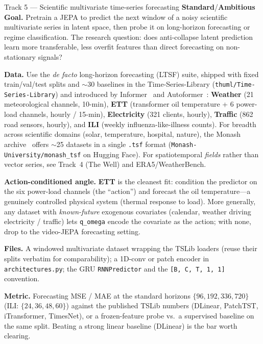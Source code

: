 \documentclass{article}
\newcommand{\code}[1]{\texttt{\small #1}}
\newcommand{\file}[1]{\texttt{\small #1}}
\newcommand{\diffmed}{\colorbox{ebamber!18}{\textcolor{ebamber}{\small\bfseries Standard}}}
\newcommand{\diffhard}{\colorbox{ebred!15}{\textcolor{ebred}{\small\bfseries Ambitious}}}
\begin{document}
\begin{trackbox}{Track 5 --- Scientific multivariate time-series forecasting \hfill \diffmed{}/\diffhard{}}
\textbf{Goal.} Pretrain a JEPA to predict the next window of a noisy scientific
multivariate series in latent space, then probe it on long-horizon forecasting or
regime classification. The research question: does anti-collapse latent prediction
learn more transferable, less overfit features than direct forecasting on
non-stationary signals?

\smallskip
\textbf{Data.} Use the \emph{de facto} long-horizon forecasting (LTSF) suite,
shipped with fixed train/val/test splits and $\sim$30 baselines in the
Time-Series-Library (\code{thuml/Time-Series-Library}) and introduced by
Informer~\citep{Informer} and Autoformer~\citep{Autoformer}: \textbf{Weather} (21
meteorological channels, 10-min), \textbf{ETT} (transformer oil temperature + 6
power-load channels, hourly / 15-min), \textbf{Electricity} (321 clients, hourly),
\textbf{Traffic} (862 road sensors, hourly), and \textbf{ILI} (weekly
influenza-like-illness counts). For breadth across scientific domains (solar,
temperature, hospital, nature), the Monash archive~\citep{MonashTSF} offers
$\sim$25 datasets in a single \code{.tsf} format (\code{Monash-University/monash\_tsf}
on Hugging Face). For spatiotemporal \emph{fields} rather than vector series, see
Track~4 (The Well) and ERA5/WeatherBench.

\smallskip
\textbf{Action-conditioned angle.} \textbf{ETT} is the cleanest fit: condition the
predictor on the six power-load channels (the ``action'') and forecast the oil
temperature---a genuinely controlled physical system (thermal response to load).
More generally, any dataset with \emph{known-future} exogenous covariates
(calendar, weather driving electricity / traffic) lets \code{q\_omega} encode the
covariate as the action; with none, drop to the video-JEPA forecasting setting.

\smallskip
\textbf{Files.} A windowed multivariate dataset wrapping the TSLib loaders (reuse
their splits verbatim for comparability); a 1D-conv or patch encoder in
\file{architectures.py}; the GRU \code{RNNPredictor} and the \code{[B, C, T, 1, 1]}
convention.

\smallskip
\textbf{Metric.} Forecasting MSE / MAE at the standard horizons
$\{96, 192, 336, 720\}$ (ILI: $\{24, 36, 48, 60\}$) against the published TSLib
numbers (DLinear, PatchTST, iTransformer, TimesNet), or a frozen-feature probe vs.\
a supervised baseline on the same split. Beating a strong linear baseline (DLinear)
is the bar worth clearing.


\end{trackbox}
\end{document}
